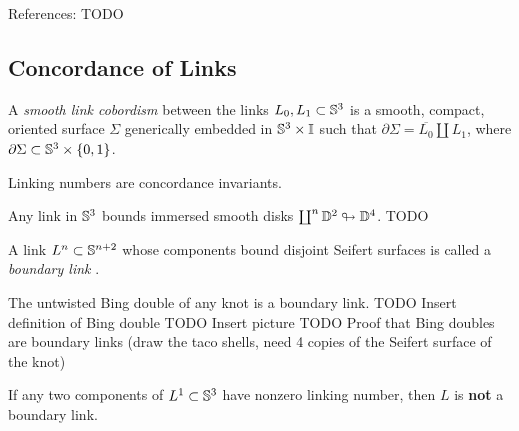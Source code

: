 \begin{remark}
	References:
	\citep{57926}
	TODO
\end{remark}

\subsection{Concordance of Links}

\begin{definition}
	A \textit{smooth link cobordism}  between the links
	$L_0, L_1 \subset \mathbb{S}^{3}$
	is a smooth, compact, oriented surface
	$\Sigma$ generically embedded in $\mathbb{S}^{3} \times \mathbb{I}$ such that
	$\partial \Sigma = \overline{L_{0}} \coprod L_{1}$,
	where $\partial \Sigma \subset \mathbb{S}^{3} \times \{0, 1\}$.
\end{definition}

\begin{proposition}
	Linking numbers are concordance invariants.
\end{proposition}

\begin{remark}
	Any link in $\mathbb{S}^{3}$ bounds immersed smooth disks
	$\coprod^{n} \mathbb{D}^{2} \looparrowright \mathbb{D}^{4}$.
	TODO
\end{remark}


\begin{definition}
	A link $L^{n} \subset \mathbb{S}^{n+2}$ whose components bound disjoint Seifert surfaces
	is called a \textit{boundary link} .
\end{definition}

\begin{example}
	The untwisted Bing double of any knot is a boundary link.
	TODO Insert definition of Bing double
	TODO Insert picture
	TODO Proof that Bing doubles are boundary links
	(draw the taco shells, need 4 copies of the Seifert surface
	of the knot)
\end{example}

\begin{proposition}
	If any two components of $L^{1} \subset \mathbb{S}^{3}$
	have nonzero linking number, then $L$ is \textbf{not}
	a boundary link.
\end{proposition}

